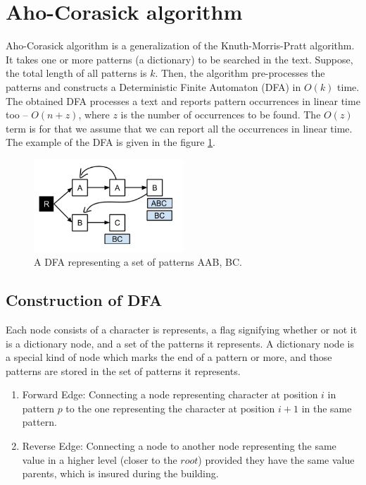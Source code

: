 \documentclass[paper=a4, fontsize=11pt]{scrartcl} %
\numberwithin{equation}{section} %
\numberwithin{figure}{section} %
\numberwithin{table}{section} %
\begin{document}
\newpage
\section{Aho-Corasick algorithm}
Aho-Corasick algorithm \cite{aho} is a generalization of the Knuth-Morris-Pratt algorithm. It takes one or more patterns (a dictionary) to be searched in the text. Suppose, the total length of all patterns is $k$. Then, the algorithm pre-processes the patterns and constructs a Deterministic Finite Automaton (DFA) \cite{hopcroft} in $O(k)$ time. The obtained DFA processes a text and reports pattern occurrences in linear time too -- $O(n + z)$, where $z$ is the number of occurrences to be found. The $O(z)$ term is for that we assume that we can report all the occurrences in linear time. The example of the DFA is given in the figure \ref{dfa}.

\begin{figure}[h!]
\centering
\includegraphics[width=0.5\textwidth]{figures/Example_DFA.png}
\caption{A DFA representing a set of patterns {AAB, BC}.}
\label{dfa}
\end{figure}

\subsection{Construction of DFA}
\label{sec:dfa_const}
Each node consists of a character is represents, a flag signifying whether or not it is a dictionary node, and a set of the patterns it represents. A dictionary node is a special kind of node which marks the end of a pattern or more, and those patterns are stored in the set of patterns it represents.

\begin{enumerate}
\item Forward Edge: Connecting a node representing character at position $i$ in pattern $p$ to the one representing the character at position $i+1$ in the same pattern.
\item Reverse Edge: Connecting a node to another node representing the same value in a higher level (closer to the $root$) provided they have the same value parents, which is insured during the building.
\end{enumerate}
\end{document}
